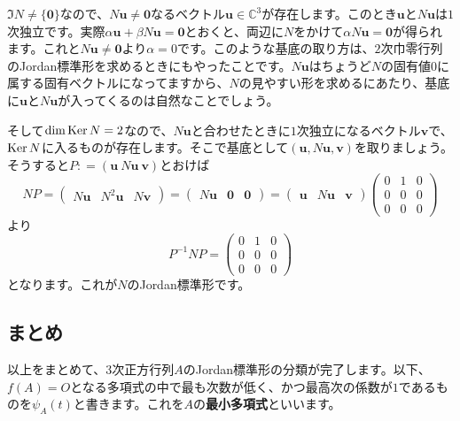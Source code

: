 $\Im N \neq \{\bm{0}\}$なので、$N \bm{u} \neq \bm{0}$なるベクトル$\bm{u} \in \mathbb{C}^3$が存在します。このとき$\bm{u}$と$N\bm{u}$は$1$次独立です。実際$\alpha \bm{u} + \beta N\bm{u} = \bm{0}$とおくと、両辺に$N$をかけて$\alpha N \bm{u} = \bm{0}$が得られます。これと$N\bm{u} \neq \bm{0}$より$\alpha = 0$です。このような基底の取り方は、$2$次巾零行列のJordan標準形を求めるときにもやったことです。$N\bm{u}$はちょうど$N$の固有値$0$に属する固有ベクトルになってますから、$N$の見やすい形を求めるにあたり、基底に$\bm{u}$と$N\bm{u}$が入ってくるのは自然なことでしょう。

そして$\dim \operatorname{Ker} N = 2$なので、$N\bm{u}$と合わせたときに$1$次独立になるベクトル$\bm{v}$で、$\operatorname{Ker} N$に入るものが存在します。そこで基底として$(\bm{u}, N\bm{u}, \bm{v})$を取りましょう。そうすると$P: = (\bm{u}\ N\bm{u}\ \bm{v})$とおけば
\[
NP =
\begin{pmatrix}
N\bm{u} & N^2\bm{u} & N\bm{v}
\end{pmatrix}
=
\begin{pmatrix}
N\bm{u} & \bm{0} & \bm{0}
\end{pmatrix}
=
\begin{pmatrix}
\bm{u} & N\bm{u} & \bm{v}
\end{pmatrix}
\begin{pmatrix}
0 & 1 & 0 \\
0 & 0 & 0 \\
0 & 0 & 0
\end{pmatrix}
\]
より
\[
P^{-1} N P =
\begin{pmatrix}
0 & 1 & 0 \\
0 & 0 & 0 \\
0 & 0 & 0
\end{pmatrix}
\]
となります。これが$N$のJordan標準形です。

\subsection{まとめ}

以上をまとめて、$3$次正方行列$A$のJordan標準形の分類が完了します。以下、$f(A) = O$となる多項式の中で最も次数が低く、かつ最高次の係数が$1$であるものを$\psi_A(t)$と書きます。これを$A$の\textbf{最小多項式}といいます。


